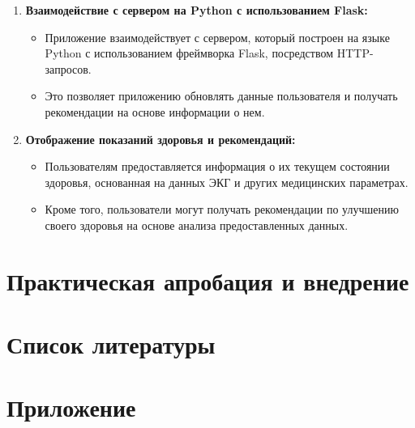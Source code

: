 \documentclass[12pt, russian]{extarticle}
\begin{document}
\begin{spacing}{1.5}
\begin{enumerate}
    \item \textbf{Взаимодействие с сервером на Python с использованием Flask:}
    \begin{itemize}
        \item Приложение взаимодействует с сервером, который построен на языке Python с использованием фреймворка Flask, посредством HTTP-запросов.
        \item Это позволяет приложению обновлять данные пользователя и получать рекомендации на основе информации о нем.
    \end{itemize}

    \item \textbf{Отображение показаний здоровья и рекомендаций:}
    \begin{itemize}
        \item Пользователям предоставляется информация о их текущем состоянии здоровья, основанная на данных ЭКГ и других медицинских параметрах.
        \item Кроме того, пользователи могут получать рекомендации по улучшению своего здоровья на основе анализа предоставленных данных.
    \end{itemize}
\end{enumerate}

\newpage
\section{Практическая апробация и внедрение}

\newpage
\section{Список литературы}


\newpage
\section{Приложение}

\end{spacing}
\end{document}
